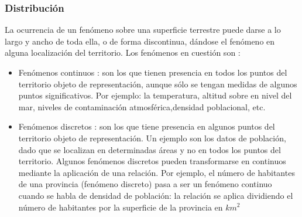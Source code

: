 \subsubsection{Distribución}
La ocurrencia de un fenómeno sobre una superficie terrestre puede darse a lo largo y ancho de toda ella, o de forma 
discontinua, dándose el fenómeno en alguna localización del territorio. Los fenómenos en cuestión son :

\begin{itemize}
    \item Fenómenos continuos :  son los que tienen presencia en todos los puntos del territorio objeto de 
    representación, aunque sólo se tengan medidas de algunos puntos significativos. Por ejemplo: la temperatura,
    altitud sobre en nivel del mar, niveles de contaminación atmosférica,densidad poblacional, etc.
    
    \item Fenómenos discretos : son los que tiene presencia en algunos puntos del territorio objeto de 
    representación. Un ejemplo son los datos de población, dado que se localizan en determinadas áreas y 
    no en todos los puntos del territorio. Algunos fenómenos discretos pueden transformarse en continuos mediante 
    la aplicación de una relación. Por ejemplo, el número de habitantes de una provincia (fenómeno discreto) pasa a 
    ser un fenómeno continuo cuando se habla de densidad de población: la relación se aplica dividiendo el número 
    de habitantes por la superficie de la provincia en $km^2$
\end{itemize}
